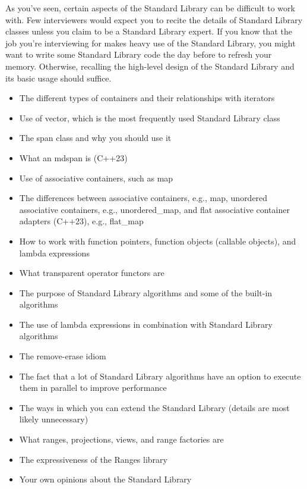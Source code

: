 
As you’ve seen, certain aspects of the Standard Library can be difficult to work with. Few interviewers would expect you to recite the details of Standard Library classes unless you claim to be a Standard Library expert. If you know that the job you’re interviewing for makes heavy use of the Standard Library, you might want to write some Standard Library code the day before to refresh your memory. Otherwise, recalling the high-level design of the Standard Library and its basic usage should suffice.


\begin{itemize}
\item
The different types of containers and their relationships with iterators

\item
Use of vector, which is the most frequently used Standard Library class

\item
The span class and why you should use it

\item
What an mdspan is (C++23)

\item
Use of associative containers, such as map

\item
The differences between associative containers, e.g., map, unordered associative containers, e.g., unordered\_map, and flat associative container adapters (C++23), e.g., flat\_map

\item
How to work with function pointers, function objects (callable objects), and lambda expressions

\item
What transparent operator functors are

\item
The purpose of Standard Library algorithms and some of the built-in algorithms

\item
The use of lambda expressions in combination with Standard Library algorithms

\item
The remove-erase idiom

\item
The fact that a lot of Standard Library algorithms have an option to execute them in parallel to improve performance

\item
The ways in which you can extend the Standard Library (details are most likely unnecessary)

\item
What ranges, projections, views, and range factories are

\item
The expressiveness of the Ranges library

\item
Your own opinions about the Standard Library
\end{itemize}

